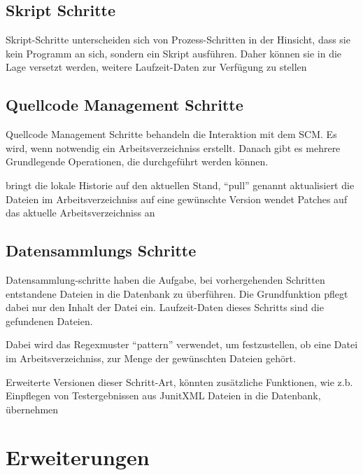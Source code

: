 \subsection{Skript Schritte}

Skript-Schritte unterscheiden sich von Prozess-Schritten in der Hinsicht,
dass sie kein Programm an sich, sondern ein Skript ausführen.
Daher können sie in die Lage versetzt werden,
weitere Laufzeit-Daten zur Verfügung zu stellen


\subsection{Quellcode Management Schritte}

Quellcode Management Schritte behandeln die Interaktion mit dem SCM.
Es wird, wenn notwendig ein Arbeitsverzeichniss erstellt.
Danach gibt es mehrere Grundlegende Operationen, die durchgeführt werden können.

\begin{description}
        bringt die lokale Historie auf den aktuellen Stand, ``pull'' genannt
        aktualisiert die Dateien im Arbeitsverzeichniss
        auf eine gewünschte Version
        wendet Patches auf das aktuelle Arbeitsverzeichniss an
\end{description}


\subsection{Datensammlungs Schritte}

Datensammlung-schritte haben die Aufgabe,
bei vorhergehenden Schritten entstandene Dateien 
in die Datenbank zu überführen.
Die Grundfunktion pflegt dabei nur den Inhalt der Datei ein.
Laufzeit-Daten dieses Schritts sind die gefundenen Dateien.

Dabei wird das Regexmuster ``pattern'' verwendet, um festzustellen,
ob eine Datei im Arbeitsverzeichniss, zur Menge der gewünschten Dateien gehört.

Erweiterte Versionen dieser Schritt-Art, könnten zusätzliche Funktionen,
wie z.b. Einpflegen von Testergebnissen aus JunitXML Dateien in die Datenbank,
übernehmen



\section{Erweiterungen}

